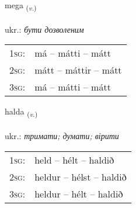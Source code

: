 \documentclass[frontgrid, backgrid]{flacards}\usepackage[]{graphicx}\usepackage[]{xcolor}
\begin{document}
\renewcommand{\blhead}{\vskip5pt {\small\bfseries\footnotesize Sagnorð | дієслово }}
\renewcommand{\bcfoot}{\vskip5pt \hspace{2pt}{\small\bfseries\footnotesize 1K}}


{mega \small{\textsubscript{(\textit{v.})}} \\[1ex] %
\textphonetic{[meiːɣa]} \\
ukr.: \emph{бути дозволеним} \\  [2ex]
\renewcommand*{\arraystretch}{0.8}
\begin{tabular}{p{1cm}l}
\textsc{1sg}: & má -- mátti -- mátt \\ 
\textsc{2sg}: & mátt -- máttir -- mátt \\ 
\textsc{3sg}: & má -- mátti -- mátt \\ 
\end{tabular}
}

\renewcommand{\flhead}{\vskip5pt \fboxsep=0pt {\small\bfseries\footnotesize Sagnorð | дієслово}}
\renewcommand{\fcfoot}{\vskip5pt \fboxsep=0pt \hspace{2pt}{\small\bfseries\footnotesize 1K}}

\renewcommand{\blhead}{\vskip5pt {\small\bfseries\footnotesize Sagnorð | дієслово }}
\renewcommand{\bcfoot}{\vskip5pt \hspace{2pt}{\small\bfseries\footnotesize 1K}}


{halda \small{\textsubscript{(\textit{v.})}} \\[1ex] %
\textphonetic{[halta]} \\
ukr.: \emph{тримати; думати; вірити} \\  [2ex]
\renewcommand*{\arraystretch}{0.8}
\begin{tabular}{p{1cm}l}
\textsc{1sg}: & held -- hélt -- haldið \\ 
\textsc{2sg}: & heldur -- hélst -- haldið \\ 
\textsc{3sg}: & heldur -- hélt -- haldið \\ 
\end{tabular}
}
\end{document}
